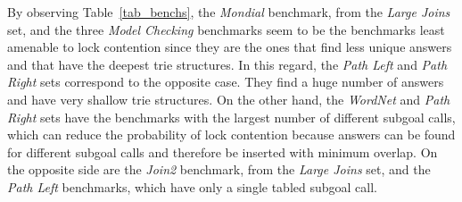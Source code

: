 \documentclass{llncs}
\begin{document}
By observing Table~\ref{tab_benchs}, the \emph{Mondial} benchmark,
from the \emph{Large Joins} set, and the three \emph{Model
  Checking} benchmarks seem to be the benchmarks least amenable to
lock contention since they are the ones that find less unique answers
and that have the deepest trie structures. In this regard, the
\emph{Path Left} and \emph{Path Right} sets correspond to the
opposite case. They find a huge number of answers and have very
shallow trie structures. On the other hand, the \emph{WordNet} and
\emph{Path Right} sets have the benchmarks with the largest number
of different subgoal calls, which can reduce the probability of lock
contention because answers can be found for different subgoal calls
and therefore be inserted with minimum overlap. On the opposite side
are the \emph{Join2} benchmark, from the \emph{Large Joins} set,
and the \emph{Path Left} benchmarks, which have only a single tabled
subgoal call.
\end{document}
